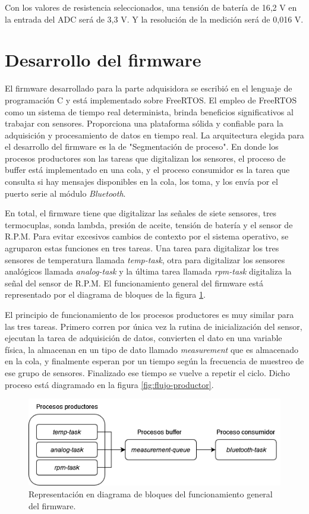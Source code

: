 Con los valores de resistencia seleccionados, una tensión de batería de 16,2 V en la entrada del ADC será de 3,3 V. Y la resolución de la medición será de 0,016 V.

\break

\section{Desarrollo del firmware}

El firmware desarrollado para la parte adquisidora se escribió en el lenguaje de programación C y está implementado sobre FreeRTOS. El empleo de FreeRTOS como un sistema de tiempo real determinista, brinda beneficios significativos al trabajar con sensores. Proporciona una plataforma sólida y confiable para la adquisición y procesamiento de datos en tiempo real. La arquitectura elegida para el desarrollo del firmware es la de "Segmentación de proceso". En donde los procesos productores son las tareas que digitalizan los sensores, el proceso de buffer está implementado en una cola, y el proceso consumidor es la tarea que consulta si hay mensajes disponibles en la cola, los toma, y los envía por el puerto serie al módulo \textit{Bluetooth}.

En total, el firmware tiene que digitalizar las señales de siete sensores, tres termocuplas, sonda lambda, presión de aceite, tensión de batería y el sensor de R.P.M. Para evitar excesivos cambios de contexto por el sistema operativo, se agruparon estas funciones en tres tareas. Una tarea para digitalizar los tres sensores de temperatura llamada \textit{temp-task}, otra para digitalizar los sensores analógicos llamada \textit{analog-task} y la última tarea llamada \textit{rpm-task} digitaliza la señal del sensor de R.P.M. El funcionamiento general del firmware está representado por el diagrama de bloques de la figura \ref{fig:diagrama-firmware}.

El principio de funcionamiento de los procesos productores es muy similar para las tres tareas. Primero corren por única vez la rutina de inicialización del sensor, ejecutan la tarea de adquisición de datos, convierten el dato en una variable física, la almacenan en un tipo de dato llamado \textit{measurement} que es almacenado en la cola, y finalmente esperan por un tiempo según la frecuencia de muestreo de ese grupo de sensores. Finalizado ese tiempo se vuelve a repetir el ciclo. Dicho proceso está diagramado en la figura \ref{fig:flujo-productor}.

\begin{figure}[htpb]
\centering
\includegraphics[width=.8\textwidth]{./Figures/diagrama-firmware.png}
\caption{Representación en diagrama de bloques del funcionamiento general del firmware.}
\label{fig:diagrama-firmware}
\end{figure}


